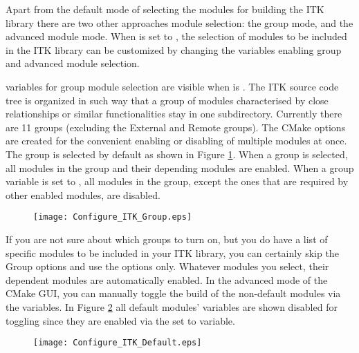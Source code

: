 Apart from the default mode of selecting the modules for building the ITK
library there are two other approaches module selection: the group mode, and the
advanced module mode. When  is set to
, the selection of modules to be included in the ITK library can be
customized by changing the variables enabling group and advanced module
selection.

 variables for group module selection are visible
when  is . The ITK source code tree
is organized in such way that a group of modules characterised by close
relationships or similar functionalities stay in one subdirectory. Currently
there are 11 groups (excluding the External and Remote groups). The CMake
 options are created for the convenient enabling
or disabling of multiple modules at once. The  group is
selected by default as shown in Figure \ref{fig:ConfigITKGroup}. When a group is
selected, all modules in the group and their depending modules are enabled. When
a group variable is set to , all modules in the group, except the ones
that are required by other enabled modules, are disabled.

\begin{figure}[htb!]
\centering
\texttt{[image: Configure\_ITK\_Group.eps]}
\label{fig:ConfigITKGroup}
\end{figure}

If you are not sure about which groups to turn on, but you do have a list of
specific modules to be included in your ITK library, you can certainly skip the
Group options and use the  options only. Whatever
modules you select, their dependent modules are automatically enabled. In the
advanced mode of the CMake GUI, you can manually toggle the build of the
non-default modules via the  variables. In Figure
\ref{fig:ConfigITKDefault} all default modules' 
variables are shown disabled for toggling since they are enabled via the
 set to  variable.

\begin{figure}[htb!]
\centering
\texttt{[image: Configure\_ITK\_Default.eps]}
\label{fig:ConfigITKDefault}
\end{figure}

